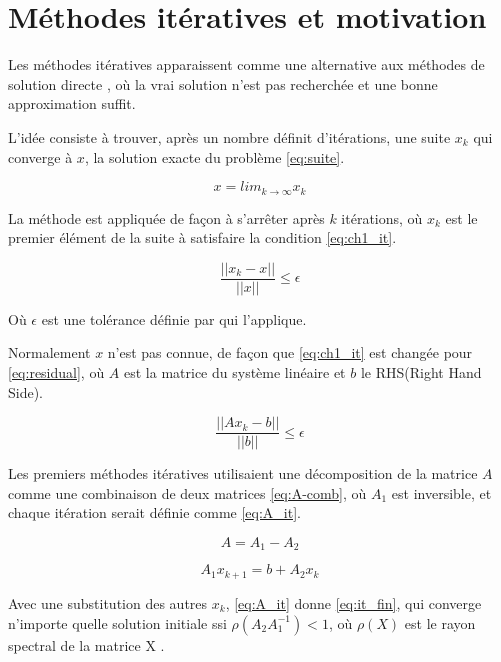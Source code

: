 \section{Méthodes itératives et motivation}
    Les méthodes itératives apparaissent comme une alternative aux méthodes de solution directe , où la vrai solution n'est pas recherchée et une bonne approximation suffit.

    L'idée consiste à trouver, après un nombre définit d'itérations, une suite ${x_{k}}$ qui converge à $x$, la solution exacte du problème \ref{eq:suite}.

    \begin{equation}\label{eq:suite}
        x = lim_{k \to \infty} x_{k}
    \end{equation}

    La méthode est appliquée de façon à s'arrêter après $k$ itérations, où $x_{k}$ est le premier élément de la suite à satisfaire la condition \ref{eq:ch1_it}.

    \begin{equation}\label{eq:ch1_it}
       \frac{||x_{k} - x||}{||x||} \leq \epsilon
    \end{equation}

    Où $\epsilon$ est une tolérance définie par qui l'applique.

    Normalement $x$ n'est pas connue, de façon que \ref{eq:ch1_it} est changée pour \ref{eq:residual}, où $A$ est la matrice du système linéaire et $b$ le RHS(Right Hand Side).

    \begin{equation}\label{eq:residual}
        \frac{||Ax_{k} - b||}{||b||} \leq \epsilon
    \end{equation}

    Les premiers méthodes itératives utilisaient une décomposition de la matrice $A$ comme une combinaison de deux matrices \ref{eq:A-comb}, où $A_{1}$ est inversible, et chaque itération serait définie comme \ref{eq:A_it}.

    \begin{equation}\label{eq:A-comb}
        A = A_{1} - A_{2}
    \end{equation}

    \begin{equation}\label{eq:A_it}
        A_{1} x_{k+1} = b + A_{2}x_{k}
    \end{equation}

    Avec une substitution des autres $x_{k}$, \ref{eq:A_it} donne \ref{eq:it_fin}, qui converge n'importe quelle solution initiale ssi $\rho(A_{2}A_{1}^{-1}) < 1$, où $\rho(X)$ est le rayon spectral de la matrice X \cite{bonnet}.

